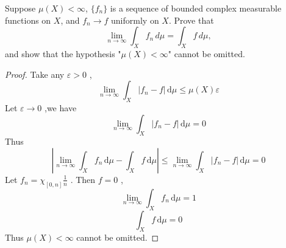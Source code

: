 \documentclass[../main.tex]{subfiles}
\begin{document}
\begin{problem}{}{}
Suppose $\mu(X) < \infty$, $\{f_n\}$ is a sequence of bounded complex measurable functions on $X$, and $f_n \to f$ uniformly on $X$. Prove that
\[ \lim_{n \to \infty} \int_X f_n \,d\mu = \int_X f \,d\mu, \]
and show that the hypothesis "$\mu(X) < \infty$" cannot be omitted.
\end{problem}
\begin{proof}
     Take any \(   \varepsilon > 0  \) ,  \[
     \lim_{n\to \infty} \int_{X} \left| f_{n}-f \right|\,\mathrm{d} \mu \le    \mu \left( X \right) \varepsilon  
     \] Let \(   \varepsilon \to 0  \) ,we have \[
     \lim_{n\to \infty}\int_{X} \left| f_{n}-f \right|\,\mathrm{d} \mu = 0 
     \]  Thus \[
     \left| \lim_{n\to \infty}\int_{X} f_{n}\,\mathrm{d} \mu - \int_{X}f\,\mathrm{d} \mu  \right| \le \lim_{n\to \infty}  \int_{X} \left| f_{n}-f \right|\,\mathrm{d} \mu = 0 
     \]Let \(  f_{n}=  \chi _{\left[ 0,n \right] }\frac{1 }{n }   \) . Then \(  f= 0  \) ,  \[
     \lim_{n\to \infty} \int_{X} f_{n}\,\mathrm{d} \mu = 1
     \] \[
     \int_{X }f\,\mathrm{d} \mu = 0
     \]  Thus \(  \mu \left( X \right)< \infty   \) cannot be omitted.  
\end{proof}
\end{document}

